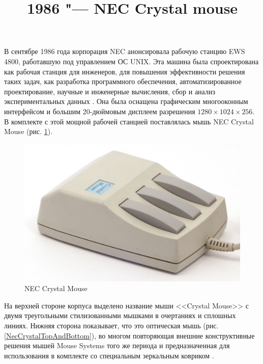 \documentclass[11pt, a4paper]{article}
\begin{document}
\title{1986 "--- NEC Crystal mouse}
\date{}
\maketitle
{}
В сентябре 1986 года корпорация NEC анонсировала рабочую станцию EWS 4800, работавшую под управлением ОС UNIX. Эта машина была спроектирована как рабочая станция для инженеров, для повышения эффективности решения таких задач, как разработка программного обеспечения, автоматизированное проектирование, научные и инженерные вычисления, сбор и анализ экспериментальных данных \cite{yt}. Она была оснащена графическим многооконным интерфейсом и большим 20-дюймовым дисплеем разрешения $1280 \times 1024 \times 256$. В комплекте с этой мощной рабочей станцией поставлялась мышь NEC Crystal Mouse (рис. \ref{fig:NECCrystalPic}).

\begin{figure}[h]
    \centering
    \includegraphics[scale=0.7]{1986_nec_crystal_mouse/necNorm_30.jpg}
    \caption{NEC Crystal Mouse}
    \label{fig:NECCrystalPic}
\end{figure}

На верхней стороне корпуса выделено название мыши <<Crystal Mouse>> с двумя треугольными стилизованными мышками в очертаниях и сплошных линиях. Нижняя сторона показывает, что это оптическая мышь (рис. \ref{NecCrystalTopAndBottom}), во многом повторяющая внешние конструктивные решения мышей Mouse Systems того же периода и предназначенная для использования в комплекте со специальным зеркальным ковриком \cite{photo}.
\end{document}
